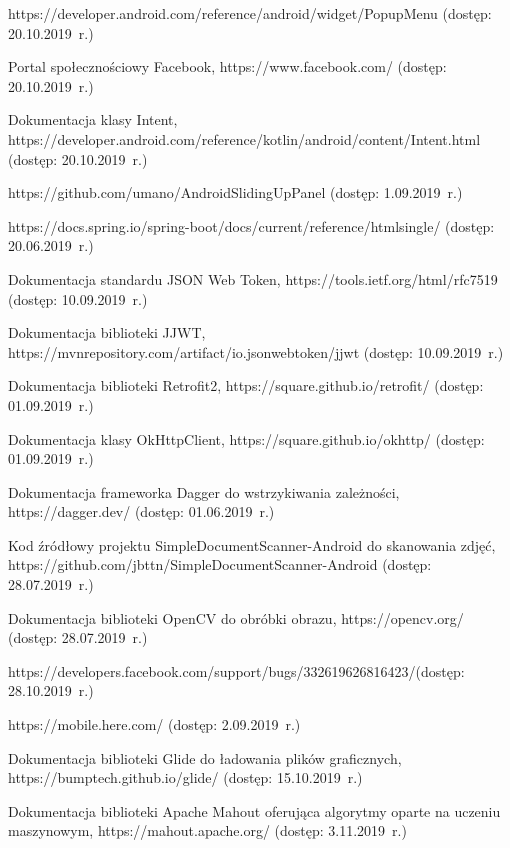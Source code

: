 \begin{thebibliography}{3}
   https://developer.android.com/reference/android/widget/PopupMenu
  (dostęp: 20.10.2019~r.)
  
   Portal społecznościowy Facebook, https://www.facebook.com/ (dostęp: 20.10.2019~r.)
  
   Dokumentacja klasy Intent, https://developer.android.com/reference/kotlin/android/content/Intent.html (dostęp: 20.10.2019~r.)
  
   https://github.com/umano/AndroidSlidingUpPanel (dostęp: 1.09.2019~r.)
  
   https://docs.spring.io/spring-boot/docs/current/reference/htmlsingle/ (dostęp: 20.06.2019~r.)
  
   Dokumentacja standardu JSON Web Token, https://tools.ietf.org/html/rfc7519 (dostęp: 10.09.2019~r.)

   Dokumentacja biblioteki JJWT, https://mvnrepository.com/artifact/io.jsonwebtoken/jjwt (dostęp: 10.09.2019~r.)

   Dokumentacja biblioteki Retrofit2, https://square.github.io/retrofit/ (dostęp: 01.09.2019~r.)

   Dokumentacja klasy OkHttpClient, https://square.github.io/okhttp/ (dostęp: 01.09.2019~r.)
  
   Dokumentacja frameworka Dagger do wstrzykiwania zależności, https://dagger.dev/ (dostęp: 01.06.2019~r.)
  
   Kod źródłowy projektu SimpleDocumentScanner-Android do skanowania zdjęć, https://github.com/jbttn/SimpleDocumentScanner-Android (dostęp: 28.07.2019~r.)
  
   Dokumentacja biblioteki OpenCV do obróbki obrazu, https://opencv.org/ (dostęp: 28.07.2019~r.)
  
   https://developers.facebook.com/support/bugs/332619626816423/(dostęp: 28.10.2019~r.)
  
   https://mobile.here.com/ (dostęp: 2.09.2019~r.)
  
   Dokumentacja biblioteki Glide do ładowania plików graficznych, https://bumptech.github.io/glide/ (dostęp: 15.10.2019~r.)
  
   Dokumentacja biblioteki Apache Mahout oferująca algorytmy oparte na uczeniu maszynowym, https://mahout.apache.org/ (dostęp: 3.11.2019~r.)
  

\end{thebibliography}
